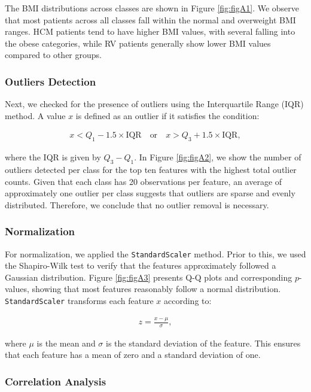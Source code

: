 The BMI distributions across classes are shown in Figure \ref{fig:figA1}. We
observe that most patients across all classes fall within the normal and
overweight BMI ranges. HCM patients tend to have higher BMI values, with
several falling into the obese categories, while RV patients generally show
lower BMI values compared to other groups.

\subsubsection{Outliers Detection}

Next, we checked for the presence of outliers using the Interquartile Range
(IQR) method. A value $x$ is defined as an outlier if it satisfies the
condition:

\begin{align}
	x < Q_1 - 1.5 \times \text{IQR} \quad \text{or} \quad x > Q_3 + 1.5 \times \text{IQR},
\end{align}

where the IQR is given by $Q_3 - Q_1$. In Figure \ref{fig:figA2}, we show the
number of outliers detected per class for the top ten features with the highest
total outlier counts. Given that each class has 20 observations per feature, an
average of approximately one outlier per class suggests that outliers are
sparse and evenly distributed. Therefore, we conclude that no outlier removal
is necessary.

\subsubsection{Normalization}

For normalization, we applied the \texttt{StandardScaler} method. Prior to
this, we used the Shapiro-Wilk test to verify that the features approximately
followed a Gaussian distribution. Figure \ref{fig:figA3} presents Q-Q plots and
corresponding \( p \)-values, showing that most features reasonably follow a
normal distribution. \texttt{StandardScaler} transforms each feature \( x \)
according to:

\begin{align}
	z = \frac{x - \mu}{\sigma},
\end{align}

where \( \mu \) is the mean and \( \sigma \) is the standard deviation of the
feature. This ensures that each feature has a mean of zero and a standard
deviation of one.

\subsubsection{Correlation Analysis}


